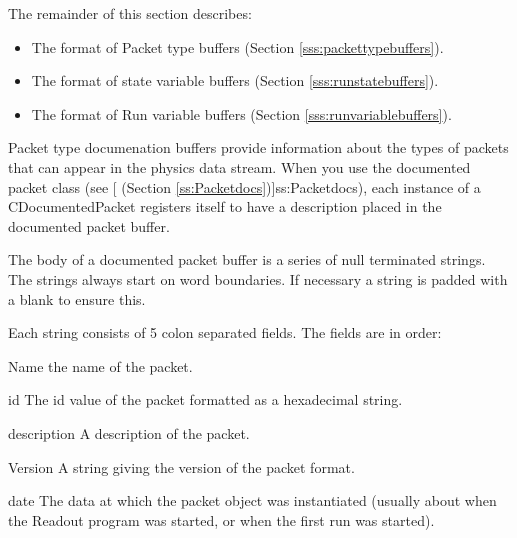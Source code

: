       \begin{iftex}
         The remainder of this section describes:
         \begin{itemize}
            \item The format of Packet type buffers
               (Section \ref{sss:packettypebuffers}).
            \item The format of state variable buffers
               (Section \ref{sss:runstatebuffers}).
            \item The format of Run variable buffers
               (Section \ref{sss:runvariablebuffers}).
         \end{itemize}
      \end{iftex}
      
         Packet type documenation buffers provide information
      about the types of packets that can appear in the 
      physics data stream.  When you use the documented
      packet class (see [
      (Section \ref{ss:Packetdocs})]{ss:Packetdocs}), 
      each instance of a CDocumentedPacket registers 
      itself to have a description placed in the
      documented packet buffer.
      
      The body of a documented packet buffer is a series
      of null terminated strings.  The strings always
      start on word boundaries.  If necessary a string 
      is padded with a blank to ensure this.
      
      Each string consists of 5 colon separated fields.
      The fields are in order:
      \begin{description}
         \item{Name} the name of the packet.
         \item{id}   The id value of the packet formatted
            as a hexadecimal string.
         \item{description} A description of the packet.
         \item{Version}  A string giving the version of the
            packet format.
         \item{date} The data at which the packet object was
            instantiated (usually about when the Readout 
            program was started, or when the first run was
            started).
      \end{description}
      
